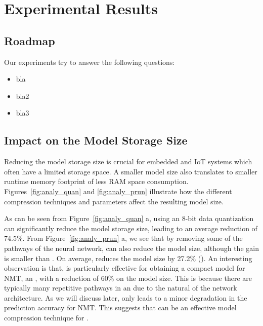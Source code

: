 \section{Experimental Results}


\subsection{Roadmap}
Our experiments try to answer the following questions:

\begin{itemize}
\item bla
\item bla2
\item bla3
\end{itemize}

\subsection{Impact on the Model Storage Size}
Reducing the model storage size is crucial for embedded and IoT systems which often have a limited storage space. A smaller model size also
translates to smaller runtime memory footprint of less RAM space consumption. Figures~\ref{fig:analy_quan} and  \ref{fig:analy_prun}
illustrate how the different compression techniques and parameters affect the resulting model size.

As can be seen from Figure~\ref{fig:analy_quan} a, using an 8-bit data quantization can significantly reduce the model storage size,
leading to an average reduction of 74.5\%. From Figure~\ref{fig:analy_prun} a, we see that by removing some of the pathways of the neural
network, \pruning can also reduce the model size, although the gain is smaller than \quantization. On average, \pruning reduces the model
size by 27.2\% (). An interesting observation is that, \pruning is particularly effective for obtaining a compact model for
NMT, an \RNN, with a reduction of 60\% on the model size. This is because there are typically many repetitive pathways in an \RNN due to
the natural of the network architecture. As we will discuss later, \pruning only leads to a minor degradation in the prediction accuracy
for NMT. This suggests that \pruning can be an effective model compression technique for \RNNs.




